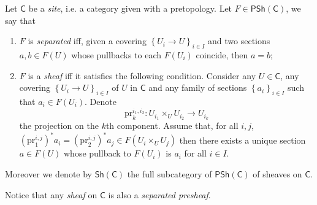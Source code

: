 \begin{defn}[Sheaves]
	Let $\mathsf{C}$ be a \emph{site}, i.e. a category given with a pretopology.
	Let $F \in \mathsf{PSh}(\mathsf{C})$, we say that
\begin{enumerate}
	\item $F$ is \emph{separated} iff, given a covering $\left\{ U_{ i } \to U \right\}_{ i \in I }$
		and two sections $a,b \in F(U)$ whose pullbacks to each $F(U_i)$ coincide,
		then $a = b$;
	\item $F$ is a \emph{sheaf} iff it satisfies the following condition.
		Consider any $U \in \mathsf{C}$, any covering $\left\{ U_{ i } \to U \right\}_{ i \in I }$
		of $U$ in $\mathsf{C}$ and any family of sections $\left\{ a_i \right\}_{i \in I}$
		such that $a_i \in F(U_i)$.
		Denote
		\begin{equation*}
		\mathrm{pr}^{i_1,i_2}_k\colon U_{i_1} \times_{ U } U_{i_2} \to U_{i_k}
		\end{equation*} 
		the projection on the $k$th component.
		Assume that, for all \(i,j\),
		$(\mathrm{pr}^{i,j}_1)^* a_i = 
		(\mathrm{pr}^{i,j}_2)^* a_j \in F( U_i \times_{ U } U_j )$
		then there exists a unique section $a \in F(U)$
		whose pullback to $F(U_i)$ is $a_i$ for all $i \in I$.
\end{enumerate}
	Moreover we denote by $\mathsf{Sh}(\mathsf{C})$ the full subcategory of $\mathsf{PSh}(\mathsf{C})$
	of sheaves on $\mathsf{C}$.
\end{defn}


\begin{rem}
	Notice that any \emph{sheaf} on $\mathsf{C}$ is also a \emph{separated presheaf}.
\end{rem}


